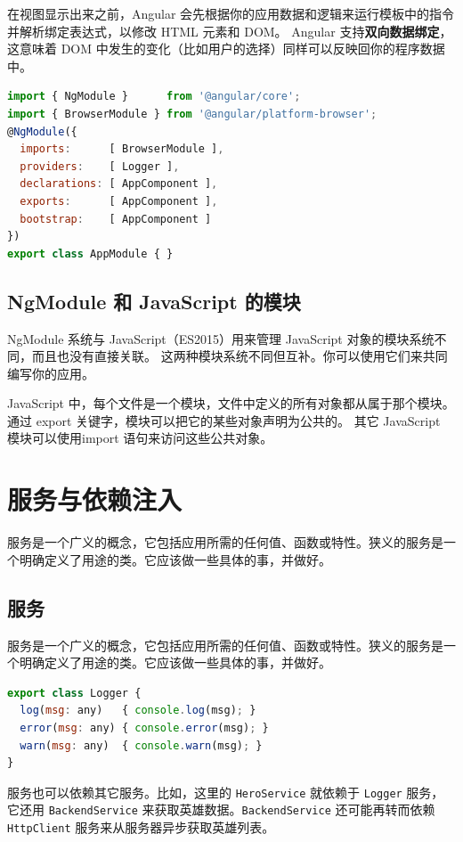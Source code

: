 \documentclass[a4paper,twoside]{ctexbook}
\begin{document}
在视图显示出来之前，Angular 会先根据你的应用数据和逻辑来运行模板中的指令并解析绑定表达式，以修改 HTML 元素和 DOM。 Angular 支持\textbf{双向数据绑定}，这意味着 DOM 中发生的变化（比如用户的选择）同样可以反映回你的程序数据中。

\begin{lstlisting}[language=JavaScript,caption={src/app/app.module.ts}]
import { NgModule }      from '@angular/core';
import { BrowserModule } from '@angular/platform-browser';
@NgModule({
  imports:      [ BrowserModule ],
  providers:    [ Logger ],
  declarations: [ AppComponent ],
  exports:      [ AppComponent ],
  bootstrap:    [ AppComponent ]
})
export class AppModule { }
\end{lstlisting}


\section{NgModule 和 JavaScript 的模块}

NgModule 系统与 JavaScript（ES2015）用来管理 JavaScript 对象的模块系统不同，而且也没有直接关联。 这两种模块系统不同但互补。你可以使用它们来共同编写你的应用。

JavaScript 中，每个文件是一个模块，文件中定义的所有对象都从属于那个模块。 通过 export 关键字，模块可以把它的某些对象声明为公共的。 其它 JavaScript 模块可以使用import 语句来访问这些公共对象。


\chapter{服务与依赖注入}

服务是一个广义的概念，它包括应用所需的任何值、函数或特性。狭义的服务是一个明确定义了用途的类。它应该做一些具体的事，并做好。


\section{服务}

服务是一个广义的概念，它包括应用所需的任何值、函数或特性。狭义的服务是一个明确定义了用途的类。它应该做一些具体的事，并做好。

\begin{lstlisting}[language=JavaScript,caption={src/app/app.module.ts}]
export class Logger {
  log(msg: any)   { console.log(msg); }
  error(msg: any) { console.error(msg); }
  warn(msg: any)  { console.warn(msg); }
}
\end{lstlisting}

服务也可以依赖其它服务。比如，这里的 \verb|HeroService| 就依赖于 \verb|Logger| 服务，它还用 \verb|BackendService| 来获取英雄数据。\verb|BackendService| 还可能再转而依赖 \verb|HttpClient| 服务来从服务器异步获取英雄列表。
\end{document}
